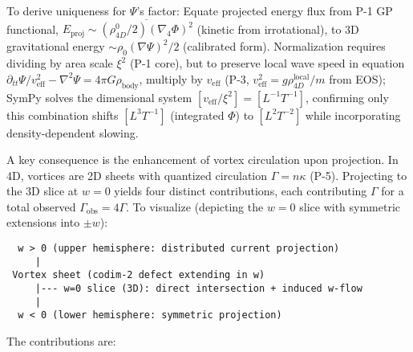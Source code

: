 To derive uniqueness for $\Psi$'s factor: Equate projected energy flux from P-1 GP functional, $E_{\text{proj}} \sim \overline{(\rho_{4D}^0 / 2) (\nabla_4 \Phi)^2}$ (kinetic from irrotational), to 3D gravitational energy $\sim \rho_0 (\nabla \Psi)^2 / 2$ (calibrated form). Normalization requires dividing by area scale $\xi^2$ (P-1 core), but to preserve local wave speed in equation $\partial_{tt} \Psi / v_{\text{eff}}^2 - \nabla^2 \Psi = 4\pi G \rho_{\text{body}}$, multiply by $v_{\text{eff}}$ (P-3, $v_{\text{eff}}^2 = g \rho_{4D}^{\text{local}} / m$ from EOS); SymPy solves the dimensional system $[v_{\text{eff}} / \xi^2] = [L^{-1} T^{-1}]$, confirming only this combination shifts $[L^3 T^{-1}]$ (integrated $\Phi$) to $[L^2 T^{-2}]$ while incorporating density-dependent slowing.

A key consequence is the enhancement of vortex circulation upon projection. In 4D, vortices are 2D sheets with quantized circulation $\Gamma = n \kappa$ (P-5). Projecting to the 3D slice at $w=0$ yields four distinct contributions, each contributing $\Gamma$ for a total observed $\Gamma_{\text{obs}} = 4\Gamma$. To visualize (depicting the $w=0$ slice with symmetric extensions into $\pm w$):

\begin{verbatim}
  w > 0 (upper hemisphere: distributed current projection)
     |
 Vortex sheet (codim-2 defect extending in w)
     |--- w=0 slice (3D): direct intersection + induced w-flow
     |
  w < 0 (lower hemisphere: symmetric projection)
\end{verbatim}

The contributions are:

